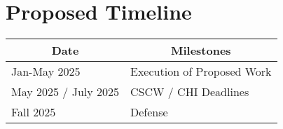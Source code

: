 
\section{Proposed Timeline}
\begin{table}[h!]
\centering
\begin{tabular}{l|l}
\multicolumn{1}{c|}{\textbf{Date}} & \multicolumn{1}{c}{\textbf{Milestones}} \\ \hline
Jan-May 2025                       & Execution of Proposed Work              \\
May 2025 / July 2025               & CSCW / CHI Deadlines                    \\
Fall 2025                          & Defense                                
\end{tabular}
\end{table}